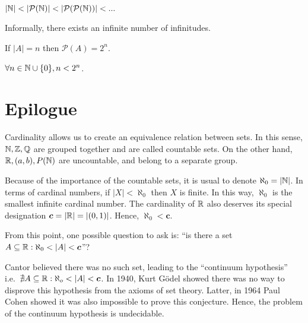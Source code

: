 \begin{theorem}
    $|\mathbb{N}| < |\mathcal{P}(\mathbb{N})| < |\mathcal{P}(\mathcal{P}(\mathbb{N}))| < ...$
\end{theorem}

Informally, there exists an infinite number of infinitudes.

\begin{theorem}
    If $|A| = n$ then $\mathcal{P}(A) = 2^n$.
\end{theorem}

\begin{corollary}
    $\forall n \in \mathbb{N} \cup \{0\}, n < 2^n$.
\end{corollary}

\section{Epilogue}

Cardinality allows us to create an equivalence relation between sets. In this sense, $\mathbb{N}, \mathbb{Z}, \mathbb{Q}$ are grouped together and are called countable sets. On the other hand, $\mathbb{R}, (a,b), P(\mathbb{N})$ are uncountable, and belong to a separate group.


Because of the importance of the countable sets, it is usual to denote $\aleph_0 = |\mathbb{N}|$. In terms of cardinal numbers, if $|X| < \aleph_0$ then $X$ is finite. In this way, $\aleph_0$ is the smallest infinite cardinal number. The cardinality of $\mathbb{R}$ also deserves its special designation $\bm c = |\mathbb{R}| = |(0,1)|$. Hence, $\aleph_0 < \bm{c}$.

From this point, one possible question to ask is: ``is there a set $A \subseteq \mathbb{R}: \aleph_0 < |A| < \bm c$''?

Cantor believed there was no such set, leading to the ``continuum hypothesis'' i.e.~$\nexists A \subseteq \mathbb{R}: \aleph_o < |A| < \bm c$. In 1940, Kurt Gödel showed there was no way to disprove this hypothesis from the axioms of set theory. Latter, in 1964 Paul Cohen showed it was also impossible to prove this conjecture. Hence, the problem of the continuum hypothesis is undecidable.
